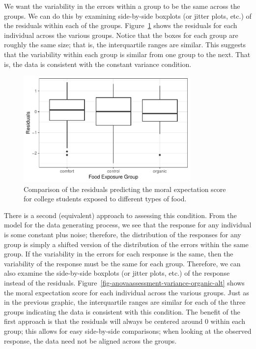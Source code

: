 \documentclass[
  letterpaper,
  DIV=11,
  numbers=noendperiod]{scrreprt}
\theoremstyle{definition}
\theoremstyle{definition}
\theoremstyle{plain}
\theoremstyle{remark}
\begin{document}
We want the variability in the errors within a group to be the same
across the groups. We can do this by examining side-by-side boxplots (or
jitter plots, etc.) of the residuals within each of the groups.
Figure~\ref{fig-anovaassessment-variance-organic} shows the residuals
for each individual across the various groups. Notice that the boxes for
each group are roughly the same size; that is, the interquartile ranges
are similar. This suggests that the variability within each group is
similar from one group to the next. That is, the data is consistent with
the constant variance condition.

\begin{figure}

{\centering \includegraphics[width=0.8\textwidth,height=\textheight]{./images/fig-anovaassessment-variance-organic-1.pdf}

}

\caption{\label{fig-anovaassessment-variance-organic}Comparison of the
residuals predicting the moral expectation score for college students
exposed to different types of food.}

\end{figure}

There is a second (equivalent) approach to assessing this condition.
From the model for the data generating process, we see that the response
for any individual is some constant plus noise; therefore, the
distribution of the responses for any group is simply a shifted version
of the distribution of the errors within the same group. If the
variability in the errors for each response is the same, then the
variability of the response must be the same for each group. Therefore,
we can also examine the side-by-side boxplots (or jitter plots, etc.) of
the response instead of the residuals.
Figure~\ref{fig-anovaassessment-variance-organic-alt} shows the moral
expectation score for each individual across the various groups. Just as
in the previous graphic, the interquartile ranges are similar for each
of the three groups indicating the data is consistent with this
condition. The benefit of the first approach is that the residuals will
always be centered around 0 within each group; this allows for easy
side-by-side comparisons; when looking at the observed response, the
data need not be aligned across the groups.
\end{document}

